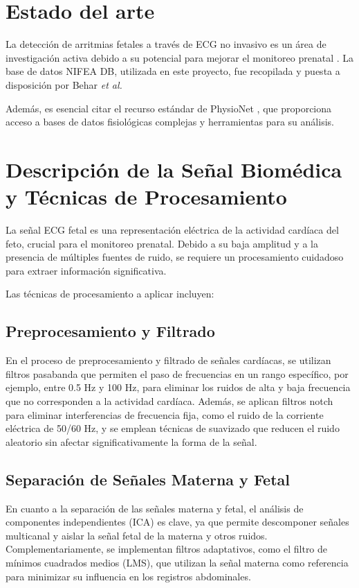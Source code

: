 \documentclass[10pt, conference]{IEEEtran}
\begin{document}
\section{Estado del arte}

La detección de arritmias fetales a través de ECG no invasivo es un área de investigación activa debido a su potencial para mejorar el monitoreo prenatal \cite{behar2019noninvasive}. La base de datos NIFEA DB, utilizada en este proyecto, fue recopilada y puesta a disposición por Behar \textit{et al.}

Además, es esencial citar el recurso estándar de PhysioNet \cite{goldberger2000physiobank}, que proporciona acceso a bases de datos fisiológicas complejas y herramientas para su análisis.

\section{Descripción de la Señal Biomédica y Técnicas de Procesamiento}

La señal ECG fetal es una representación eléctrica de la actividad cardíaca del feto, crucial para el monitoreo prenatal. Debido a su baja amplitud y a la presencia de múltiples fuentes de ruido, se requiere un procesamiento cuidadoso para extraer información significativa.

Las técnicas de procesamiento a aplicar incluyen:

\subsection{Preprocesamiento y Filtrado}

En el proceso de preprocesamiento y filtrado de señales cardíacas, se utilizan filtros pasabanda que permiten el paso de frecuencias en un rango específico, por ejemplo, entre 0.5 Hz y 100 Hz, para eliminar los ruidos de alta y baja frecuencia que no corresponden a la actividad cardíaca. Además, se aplican filtros notch para eliminar interferencias de frecuencia fija, como el ruido de la corriente eléctrica de 50/60 Hz, y se emplean técnicas de suavizado que reducen el ruido aleatorio sin afectar significativamente la forma de la señal.

\subsection{Separación de Señales Materna y Fetal}

En cuanto a la separación de las señales materna y fetal, el análisis de componentes independientes (ICA) es clave, ya que permite descomponer señales multicanal y aislar la señal fetal de la materna y otros ruidos. Complementariamente, se implementan filtros adaptativos, como el filtro de mínimos cuadrados medios (LMS), que utilizan la señal materna como referencia para minimizar su influencia en los registros abdominales.
\end{document}
